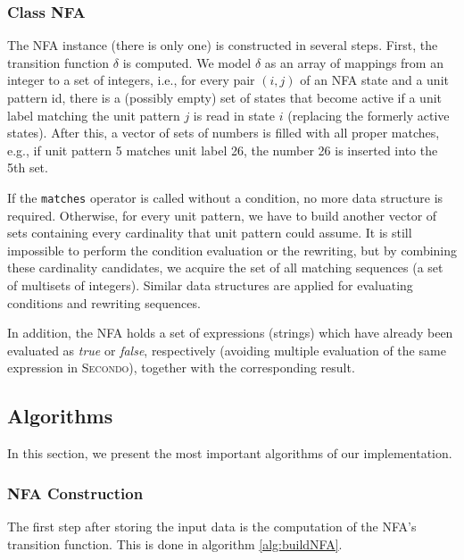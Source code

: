 \documentclass{sig-alternate}
\newcommand{\ic}[1]{\textit{#1}}
\newcommand{\secondo}{\textsc{Secondo}}
\begin{document}
\subsubsection{Class NFA}
The NFA instance (there is only one) is constructed in several steps. First, the transition function $\delta$ is computed. We model $\delta$ as an array of mappings from an integer to a set of integers, i.e., for every pair $(i,j)$ of an NFA state and a unit pattern id, there is a (possibly empty) set of states that become active if a unit label matching the unit pattern $j$ is read in state $i$ (replacing the formerly active states). After this, a vector of sets of numbers is filled with all proper matches, e.g., if unit pattern 5 matches unit label 26, the number 26 is inserted into the 5th set.

If the \texttt{matches} operator is called without a condition, no more data structure is required. Otherwise, for every unit pattern, we have to build another vector of sets containing every cardinality that unit pattern could assume. It is still impossible to perform the condition evaluation or the rewriting, but by combining these cardinality candidates, we acquire the set of all matching sequences (a set of multisets of integers). Similar data structures are applied for evaluating conditions and rewriting sequences.

In addition, the NFA holds a set of expressions (strings) which have already been evaluated as \ic{true} or \ic{false}, respectively (avoiding multiple evaluation of the same expression in \secondo), together with the corresponding result.

\subsection{Algorithms}
\IncMargin{-1mm}
\SetInd{2.5mm}{1.5mm}
\SetNlSkip{2mm}
In this section, we present the most important algorithms of our implementation.

\subsubsection{NFA Construction}
The first step after storing the input data is the computation of the NFA's transition function. This is done in algorithm \ref{alg:buildNFA}.
\end{document}
